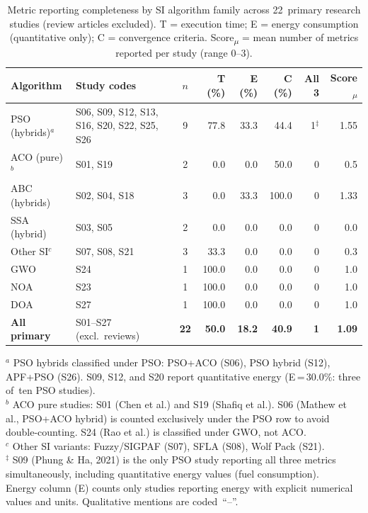 \documentclass[review,3p]{elsarticle}
\begin{document}
\begin{table}[htbp]
\centering
\caption{Metric reporting completeness by SI algorithm family across
22~primary research studies (review articles excluded). T = execution time;
E = energy consumption (quantitative only); C = convergence criteria.
Score\textsubscript{$\mu$} = mean number of metrics reported per study (range 0--3).}
\label{tab:metrics_by_algo}
\footnotesize
\setlength{\tabcolsep}{4pt}
\begin{tabularx}{\textwidth}{lXcrrrrr}
\toprule
\textbf{Algorithm} &
\textbf{Study codes} &
\textbf{$n$} &
\textbf{T (\%)} &
\textbf{E (\%)} &
\textbf{C (\%)} &
\textbf{All 3} &
\textbf{Score\textsubscript{$\mu$}} \\
\midrule
PSO (hybrids)$^{a}$
  & S06, S09, S12, S13, S16, S20, S22, S25, S26
  & 9 & 77.8 & 33.3 & 44.4 & 1$^{\ddagger}$ & 1.55 \\
ACO (pure)$^{b}$
  & S01, S19
  & 2  & 0.0  & 0.0  & 50.0 & 0 & 0.5 \\
ABC (hybrids)
  & S02, S04, S18
  & 3  & 0.0  & 33.3 & 100.0 & 0 & 1.33 \\
SSA (hybrid)
  & S03, S05
  & 2  & 0.0  & 0.0  & 0.0  & 0 & 0.0 \\
Other SI$^{c}$
  & S07, S08, S21
  & 3  & 33.3 & 0.0  & 0.0  & 0 & 0.3 \\
\midrule
GWO & S24 & 1 & 100.0 & 0.0 & 0.0  & 0 & 1.0 \\
NOA & S23 & 1 & 100.0 & 0.0 & 0.0  & 0 & 1.0 \\
DOA & S27 & 1 & 100.0 & 0.0 & 0.0  & 0 & 1.0 \\
\midrule
\textbf{All primary}
  & S01--S27 (excl.\ reviews)
  & \textbf{22} & \textbf{50.0} & \textbf{18.2} & \textbf{40.9} & \textbf{1} & \textbf{1.09} \\
\bottomrule
\end{tabularx}
\begin{minipage}{\linewidth}
\scriptsize\medskip
$^{a}$ PSO hybrids classified under PSO: PSO+ACO (S06), PSO hybrid (S12), APF+PSO (S26).
S09, S12, and S20 report quantitative energy (E\,=\,30.0\%: three of~ten PSO studies).\\
$^{b}$ ACO pure studies: S01 (Chen et al.) and S19 (Shafiq et al.). S06 (Mathew et al.,
PSO+ACO hybrid) is counted exclusively under the PSO row to avoid double-counting.
S24 (Rao et al.) is classified under GWO, not ACO.\\
$^{c}$ Other SI variants: Fuzzy/SIGPAF (S07), SFLA (S08), Wolf Pack (S21).\\
$^{\ddagger}$ S09 (Phung \& Ha, 2021) is the only PSO study reporting all three metrics
simultaneously, including quantitative energy values (fuel consumption).\\
Energy column (E) counts only studies reporting energy with explicit numerical values
and units. Qualitative mentions are coded~``--''.
\end{minipage}
\end{table}
\end{document}
